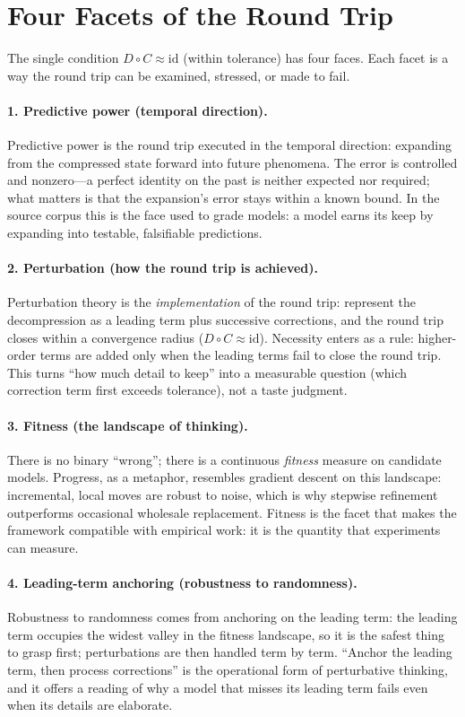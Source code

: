 \documentclass[11pt]{article}
\newcommand{\Cmap}{C}
\newcommand{\Dmap}{D}
\begin{document}
\section{Four Facets of the Round Trip}
\label{sec:facets}

The single condition $\Dmap\circ\Cmap\approx\mathrm{id}$ (within tolerance) has
four faces. Each facet is
a way the round trip can be examined, stressed, or made to fail.

\paragraph{1. Predictive power (temporal direction).}
Predictive power is the round trip executed in the temporal direction: expanding
from the compressed state forward into future phenomena. The error is
controlled and nonzero---a perfect identity on the past is neither expected nor
required; what matters is that the expansion's error stays within a known bound.
In the source corpus this is the face used to grade models: a model earns its
keep by expanding into testable, falsifiable predictions.

\paragraph{2. Perturbation (how the round trip is achieved).}
Perturbation theory is the \emph{implementation} of the round trip: represent
the decompression as a leading term plus successive corrections, and the round
trip closes within a convergence radius ($\Dmap\circ\Cmap\approx\mathrm{id}$).
Necessity enters as a rule: higher-order terms are added only when the leading
terms fail to close the round trip. This turns ``how much detail to keep'' into
a measurable question (which correction term first exceeds tolerance), not a
taste judgment.

\paragraph{3. Fitness (the landscape of thinking).}
There is no binary ``wrong''; there is a continuous \emph{fitness} measure on
candidate models. Progress, as a metaphor, resembles gradient descent on this landscape:
incremental, local moves are robust to noise, which is why stepwise refinement
outperforms occasional wholesale replacement. Fitness is the facet that makes the framework
compatible with empirical work: it is the quantity that experiments can measure.

\paragraph{4. Leading-term anchoring (robustness to randomness).}
Robustness to randomness comes from anchoring on the leading term: the leading
term occupies the widest valley in the fitness landscape, so it is the safest
thing to grasp first; perturbations are then handled term by term. ``Anchor the
leading term, then process corrections'' is the operational form of
perturbative thinking, and it offers a reading of why a model that misses its
leading term fails even when its details are elaborate.
\end{document}
